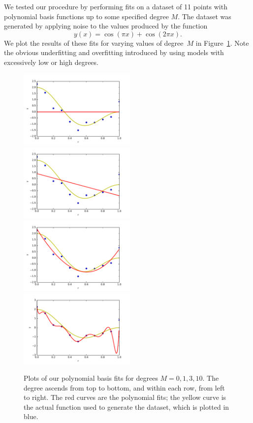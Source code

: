 \documentclass{amsart}
\begin{document}
We tested our procedure by performing fits on a dataset of 11 points with polynomial basis functions up to some specified degree $M$. The dataset was generated by applying noise to the values produced by the function
\begin{equation}
y(x) = \cos(\pi x) + \cos(2\pi x).
\end{equation}
We plot the results of these fits for varying values of degree~$M$ in Figure~\ref{fig:2.1-polybasis}. Note the obvious underfitting and overfitting introduced by using models with excessively low or high degrees.


\begin{figure}[h] %
   \centering
   \includegraphics[width=2.25in]{img/2-1_degree0.pdf}  %
   \includegraphics[width=2.25in]{img/2-1_degree1.pdf}  %
   \includegraphics[width=2.25in]{img/2-1_degree3.pdf}  %
   \includegraphics[width=2.25in]{img/2-1_degree10.pdf}  %
   \caption{Plots of our polynomial basis fits for degrees $M=0,1,3,10$. The degree ascends from top to bottom, and within each row, from left to right. The red curves are the polynomial fits; the yellow curve is the actual function used to generate the dataset, which is plotted in blue.}
   \label{fig:2.1-polybasis}
\end{figure}
\end{document}
